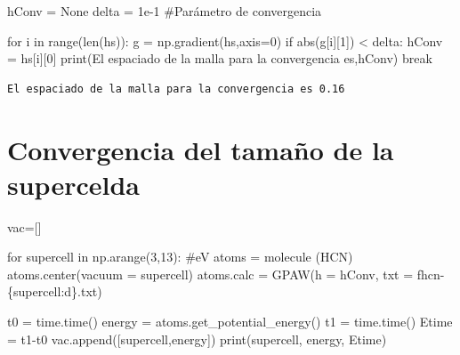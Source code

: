 \documentclass[
  letterpaper,
  DIV=11,
  numbers=noendperiod]{scrreprt}
\newenvironment{Shaded}{\begin{snugshade}}{\end{snugshade}}
\newcommand{\BuiltInTok}[1]{\textcolor[rgb]{0.00,0.23,0.31}{#1}}
\newcommand{\CommentTok}[1]{\textcolor[rgb]{0.37,0.37,0.37}{#1}}
\newcommand{\ControlFlowTok}[1]{\textcolor[rgb]{0.00,0.23,0.31}{#1}}
\newcommand{\DecValTok}[1]{\textcolor[rgb]{0.68,0.00,0.00}{#1}}
\newcommand{\FloatTok}[1]{\textcolor[rgb]{0.68,0.00,0.00}{#1}}
\newcommand{\KeywordTok}[1]{\textcolor[rgb]{0.00,0.23,0.31}{#1}}
\newcommand{\NormalTok}[1]{\textcolor[rgb]{0.00,0.23,0.31}{#1}}
\newcommand{\OperatorTok}[1]{\textcolor[rgb]{0.37,0.37,0.37}{#1}}
\newcommand{\SpecialCharTok}[1]{\textcolor[rgb]{0.37,0.37,0.37}{#1}}
\newcommand{\SpecialStringTok}[1]{\textcolor[rgb]{0.13,0.47,0.30}{#1}}
\newcommand{\StringTok}[1]{\textcolor[rgb]{0.13,0.47,0.30}{#1}}
\newcommand{\VariableTok}[1]{\textcolor[rgb]{0.07,0.07,0.07}{#1}}
\begin{document}
\begin{Shaded}
\begin{Highlighting}[]
\NormalTok{hConv }\OperatorTok{=} \VariableTok{None}
\NormalTok{delta }\OperatorTok{=} \FloatTok{1e{-}1} \CommentTok{\#Parámetro de convergencia}

\ControlFlowTok{for}\NormalTok{ i }\KeywordTok{in} \BuiltInTok{range}\NormalTok{(}\BuiltInTok{len}\NormalTok{(hs)):}
\NormalTok{  g }\OperatorTok{=}\NormalTok{ np.gradient(hs,axis}\OperatorTok{=}\DecValTok{0}\NormalTok{)}
  \ControlFlowTok{if} \BuiltInTok{abs}\NormalTok{(g[i][}\DecValTok{1}\NormalTok{]) }\OperatorTok{\textless{}}\NormalTok{ delta:}
\NormalTok{    hConv }\OperatorTok{=}\NormalTok{ hs[i][}\DecValTok{0}\NormalTok{]}
    \BuiltInTok{print}\NormalTok{(}\StringTok{\textquotesingle{}El espaciado de la malla para la convergencia es\textquotesingle{}}\NormalTok{,hConv)}
    \ControlFlowTok{break}
\end{Highlighting}
\end{Shaded}

\begin{verbatim}
El espaciado de la malla para la convergencia es 0.16
\end{verbatim}

\hypertarget{convergencia-del-tamauxf1o-de-la-supercelda}{%
\section{Convergencia del tamaño de la
supercelda}\label{convergencia-del-tamauxf1o-de-la-supercelda}}

\begin{Shaded}
\begin{Highlighting}[]
\NormalTok{vac}\OperatorTok{=}\NormalTok{[]}

\ControlFlowTok{for}\NormalTok{ supercell }\KeywordTok{in}\NormalTok{ np.arange(}\DecValTok{3}\NormalTok{,}\DecValTok{13}\NormalTok{): }\CommentTok{\#eV}
\NormalTok{    atoms }\OperatorTok{=}\NormalTok{ molecule (}\StringTok{\textquotesingle{}HCN\textquotesingle{}}\NormalTok{)}
\NormalTok{    atoms.center(vacuum }\OperatorTok{=}\NormalTok{ supercell)}
\NormalTok{    atoms.calc }\OperatorTok{=}\NormalTok{ GPAW(h }\OperatorTok{=}\NormalTok{ hConv, txt }\OperatorTok{=} \SpecialStringTok{f\textquotesingle{}hcn{-}}\SpecialCharTok{\{}\NormalTok{supercell}\SpecialCharTok{:d\}}\SpecialStringTok{.txt\textquotesingle{}}\NormalTok{)}

\NormalTok{    t0 }\OperatorTok{=}\NormalTok{ time.time()}
\NormalTok{    energy }\OperatorTok{=}\NormalTok{ atoms.get\_potential\_energy()}
\NormalTok{    t1 }\OperatorTok{=}\NormalTok{ time.time()}
\NormalTok{    Etime }\OperatorTok{=}\NormalTok{ t1}\OperatorTok{{-}}\NormalTok{t0}
\NormalTok{    vac.append([supercell,energy])}
    \BuiltInTok{print}\NormalTok{(supercell, energy, Etime)}
\end{Highlighting}
\end{Shaded}
\end{document}
